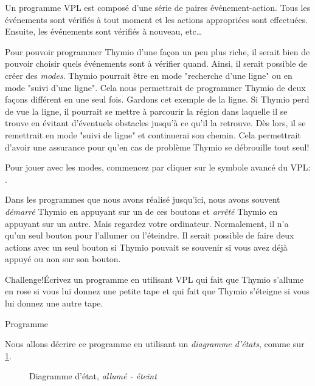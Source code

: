 \label{ch.states}

Un programme VPL est composé d'une série de paires événement-action. Tous les événements sont vérifiés à tout moment et les actions appropriées sont effectuées. Ensuite, les événements sont vérifiés à nouveau, etc\ldots

Pour pouvoir programmer Thymio d'une façon un peu plus riche, il serait bien de pouvoir choisir quels événements sont à vérifier quand. Ainsi, il serait possible de créer des \textit{modes}. Thymio pourrait être en mode "recherche d'une ligne" ou en mode "suivi d'une ligne". Cela nous permettrait de programmer Thymio de deux façons différent en une seul fois. Gardons cet exemple de la ligne. Si Thymio perd de vue la ligne, il pourrait se mettre à parcourir la région dans laquelle il se trouve en évitant d'éventuels obstacles jusqu'à ce qu'il la retrouve. Dès lors, il se remettrait en mode "suivi de ligne" et continuerai son chemin. Cela permettrait d'avoir une assurance pour qu'en cas de problème Thymio se débrouille tout seul!

Pour jouer avec les modes, commencez par cliquer sur le symbole avancé du VPL:   .



Dans les programmes que nous avons réalisé jusqu'ici, nous avons souvent \emph{démarré} Thymio en appuyant sur un de ces boutons et \emph{arrêté} Thymio en appuyant sur un autre. Mais regardez votre ordinateur. Normalement, il n'a qu'un seul bouton pour l'allumer ou l'éteindre. Il serait possible de faire deux actions avec un seul bouton si Thymio pouvait se souvenir si vous avez déjà appuyé ou non sur son bouton.

\begin{bclogo}[couleur = pink!30, arrondi = 0.1, logo = \bccrayon, ombre = true]{Challenge!}Écrivez un programme en utilisant VPL qui fait que Thymio s'allume en rose si vous lui donnez une petite tape et qui fait que Thymio s'éteigne si vous lui donnez une autre tape.
\end{bclogo}

{\raggedleft \hfill Programme }

Nous allons décrire ce programme en utilisant un \textit{diagramme d'états}, comme sur \cref{fig.turn-on-off}.

\begin{figure}
\begin{center}
\caption{Diagramme d'état, \textit{allumé - éteint}}\label{fig.turn-on-off}
\end{center}
\end{figure}

